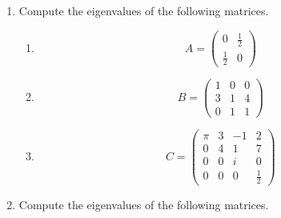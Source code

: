 \begin{enumerate}
	\item Compute the eigenvalues of the following matrices.
	\begin{enumerate}
		\item $$ A= 
		\begin{pmatrix}
		0&\frac{1}{2}\\
		\frac{1}{2}&0
		\end{pmatrix}
		$$
		\item
		$$ B=
		\begin{pmatrix}
		1&0&0\\
		3&1&4\\
		0&1&1
		\end{pmatrix}
		$$
		\item $$C=
		\begin{pmatrix}
		\pi& 3& -1& 2\\
		0 & 4& 1  & 7\\
		0 & 0& i  & 0\\
		0 & 0& 0  & \frac{1}{2}
		\end{pmatrix}
		$$
		
	\end{enumerate}
	\item Compute the eigenvalues of the following matrices.
	

\end{enumerate}
